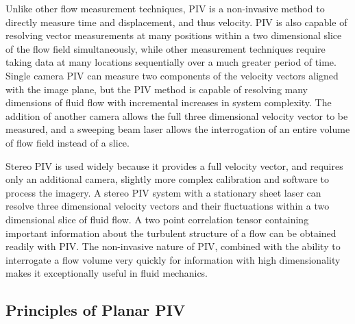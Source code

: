 Unlike other flow measurement techniques, PIV is a non-invasive method to 
directly measure time and displacement, and thus velocity. PIV is also capable 
of resolving vector measurements at many positions within a two dimensional 
slice of the flow field simultaneously, while other measurement techniques 
require taking data at many locations sequentially over a much greater period 
of time. Single camera PIV can measure two components of the velocity vectors 
aligned with the image plane, but the PIV method is capable of resolving many 
dimensions of fluid flow with incremental increases in system complexity. The 
addition of another camera allows the full three dimensional velocity vector to 
be measured, and a sweeping beam laser allows the interrogation of an entire 
volume of flow field instead of a slice.

Stereo PIV is used widely because it provides a full velocity vector, and 
requires only an additional camera, slightly more complex calibration and 
software to process the imagery.  A stereo PIV system with a 
stationary sheet laser can resolve three dimensional velocity vectors and their 
fluctuations within a two dimensional slice of fluid flow. A two point 
correlation tensor containing important information about the turbulent 
structure of a flow can be obtained readily with PIV. The non-invasive nature 
of PIV, combined with the  ability to interrogate a flow volume very quickly 
for information with high dimensionality makes it exceptionally useful in fluid 
mechanics. \cite{adrian1991}

\subsection{Principles of Planar PIV}

